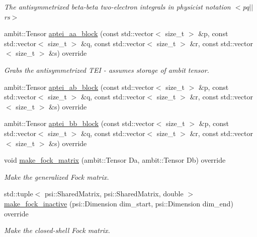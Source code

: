\begin{DoxyCompactItemize}
\begin{DoxyCompactList}\small\item\em The antisymmetrixed beta-\/beta two-\/electron integrals in physicist notation $<$pq$\vert$$\vert$rs$>$ \end{DoxyCompactList}\item 
ambit\+::\+Tensor \mbox{\hyperlink{classforte_1_1_custom_integrals_ae60addb837588a5101f1f2485a818426}{aptei\+\_\+aa\+\_\+block}} (const std\+::vector$<$ size\+\_\+t $>$ \&p, const std\+::vector$<$ size\+\_\+t $>$ \&q, const std\+::vector$<$ size\+\_\+t $>$ \&r, const std\+::vector$<$ size\+\_\+t $>$ \&s) override
\begin{DoxyCompactList}\small\item\em Grabs the antisymmetrized T\+EI -\/ assumes storage of ambit tensor. \end{DoxyCompactList}\item 
ambit\+::\+Tensor \mbox{\hyperlink{classforte_1_1_custom_integrals_af65b7d58e92e6ec9a13c93238724a831}{aptei\+\_\+ab\+\_\+block}} (const std\+::vector$<$ size\+\_\+t $>$ \&p, const std\+::vector$<$ size\+\_\+t $>$ \&q, const std\+::vector$<$ size\+\_\+t $>$ \&r, const std\+::vector$<$ size\+\_\+t $>$ \&s) override
\item 
ambit\+::\+Tensor \mbox{\hyperlink{classforte_1_1_custom_integrals_a71e29eaa0e9b1a84fe679e147c22398f}{aptei\+\_\+bb\+\_\+block}} (const std\+::vector$<$ size\+\_\+t $>$ \&p, const std\+::vector$<$ size\+\_\+t $>$ \&q, const std\+::vector$<$ size\+\_\+t $>$ \&r, const std\+::vector$<$ size\+\_\+t $>$ \&s) override
\item 
void \mbox{\hyperlink{classforte_1_1_custom_integrals_aae47837ebc64bb62efb0c23107ebfafa}{make\+\_\+fock\+\_\+matrix}} (ambit\+::\+Tensor Da, ambit\+::\+Tensor Db) override
\begin{DoxyCompactList}\small\item\em Make the generalized Fock matrix. \end{DoxyCompactList}\item 
std\+::tuple$<$ psi\+::\+Shared\+Matrix, psi\+::\+Shared\+Matrix, double $>$ \mbox{\hyperlink{classforte_1_1_custom_integrals_a00921e140fba2f63eb8399003029ad1a}{make\+\_\+fock\+\_\+inactive}} (psi\+::\+Dimension dim\+\_\+start, psi\+::\+Dimension dim\+\_\+end) override
\begin{DoxyCompactList}\small\item\em Make the closed-\/shell Fock matrix. \end{DoxyCompactList}\item 

\end{DoxyCompactItemize}
